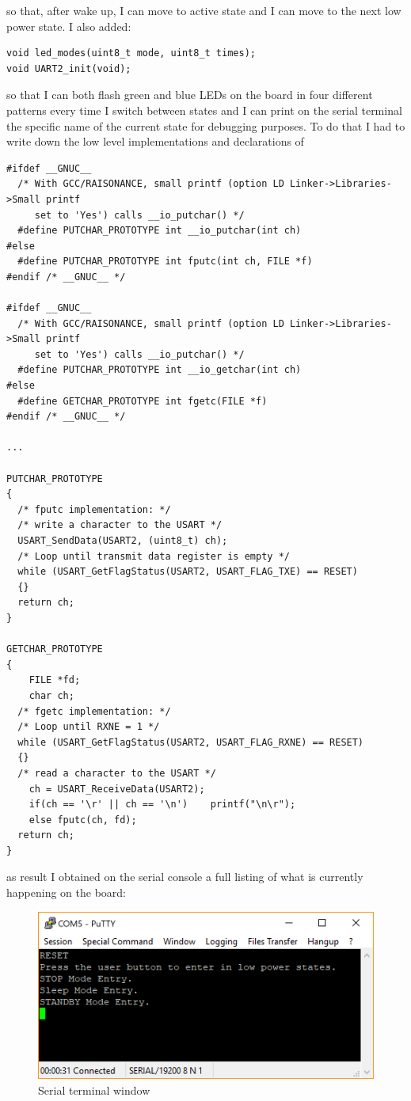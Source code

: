 \documentclass[peerreview]{IEEEtran}
\begin{document}
so that, after wake up, I can move to active state and I can move to the next low power state. I also added:
\begin{lstlisting}[style=CStyle]
void led_modes(uint8_t mode, uint8_t times);
void UART2_init(void);
\end{lstlisting}
so that I can both flash green and blue LEDs on the board in four different patterns every time I switch between states and I can print on the serial terminal the specific name of the current state for debugging purposes. To do that I had to write down the low level implementations and declarations of
\begin{lstlisting}[style=CStyle]
#ifdef __GNUC__
  /* With GCC/RAISONANCE, small printf (option LD Linker->Libraries->Small printf
     set to 'Yes') calls __io_putchar() */
  #define PUTCHAR_PROTOTYPE int __io_putchar(int ch)
#else
  #define PUTCHAR_PROTOTYPE int fputc(int ch, FILE *f)
#endif /* __GNUC__ */
	
#ifdef __GNUC__
  /* With GCC/RAISONANCE, small printf (option LD Linker->Libraries->Small printf
     set to 'Yes') calls __io_putchar() */
  #define PUTCHAR_PROTOTYPE int __io_getchar(int ch)
#else
  #define GETCHAR_PROTOTYPE int fgetc(FILE *f)
#endif /* __GNUC__ */

...

PUTCHAR_PROTOTYPE
{
  /* fputc implementation: */
  /* write a character to the USART */
  USART_SendData(USART2, (uint8_t) ch);
  /* Loop until transmit data register is empty */
  while (USART_GetFlagStatus(USART2, USART_FLAG_TXE) == RESET)
  {}
  return ch;
}

GETCHAR_PROTOTYPE
{
	FILE *fd;
	char ch;
  /* fgetc implementation: */
  /* Loop until RXNE = 1 */
  while (USART_GetFlagStatus(USART2, USART_FLAG_RXNE) == RESET)
  {}
  /* read a character to the USART */
	ch = USART_ReceiveData(USART2);
	if(ch == '\r' || ch == '\n')	printf("\n\r");
	else fputc(ch, fd);
  return ch;
}
\end{lstlisting}
as result I obtained on the serial console a full listing of what is currently happening on the board:\\
\begin{figure}[!ht]
\centering
\includegraphics[width=0.8\columnwidth]{serial} 
\caption{Serial terminal window}
\label{fig_serial}
\end{figure}
\end{document}
